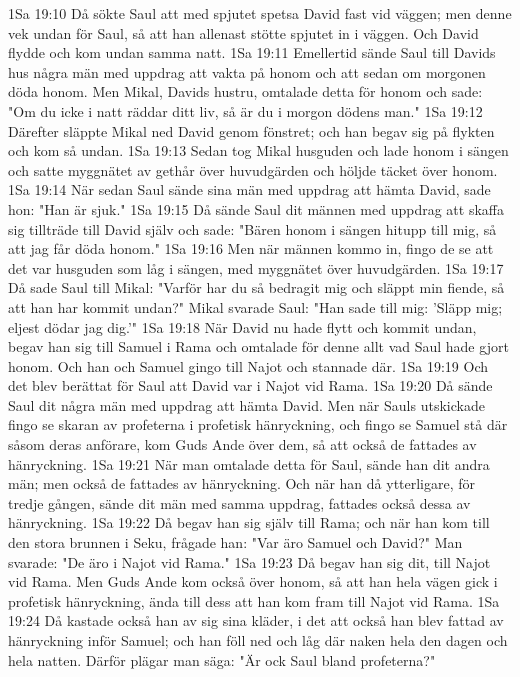 1Sa 19:10  Då sökte Saul att med spjutet spetsa David fast vid väggen; men denne vek undan för Saul, så att han allenast stötte spjutet in i väggen. Och David flydde och kom undan samma natt.
1Sa 19:11  Emellertid sände Saul till Davids hus några män med uppdrag att vakta på honom och att sedan om morgonen döda honom. Men Mikal, Davids hustru, omtalade detta för honom och sade: "Om du icke i natt räddar ditt liv, så är du i morgon dödens man."
1Sa 19:12  Därefter släppte Mikal ned David genom fönstret; och han begav sig på flykten och kom så undan.
1Sa 19:13  Sedan tog Mikal husguden och lade honom i sängen och satte myggnätet av gethår över huvudgärden och höljde täcket över honom.
1Sa 19:14  När sedan Saul sände sina män med uppdrag att hämta David, sade hon: "Han är sjuk."
1Sa 19:15  Då sände Saul dit männen med uppdrag att skaffa sig tillträde till David själv och sade: "Bären honom i sängen hitupp till mig, så att jag får döda honom."
1Sa 19:16  Men när männen kommo in, fingo de se att det var husguden som låg i sängen, med myggnätet över huvudgärden.
1Sa 19:17  Då sade Saul till Mikal: "Varför har du så bedragit mig och släppt min fiende, så att han har kommit undan?" Mikal svarade Saul: "Han sade till mig: 'Släpp mig; eljest dödar jag dig.'"
1Sa 19:18  När David nu hade flytt och kommit undan, begav han sig till Samuel i Rama och omtalade för denne allt vad Saul hade gjort honom. Och han och Samuel gingo till Najot och stannade där.
1Sa 19:19  Och det blev berättat för Saul att David var i Najot vid Rama.
1Sa 19:20  Då sände Saul dit några män med uppdrag att hämta David. Men när Sauls utskickade fingo se skaran av profeterna i profetisk hänryckning, och fingo se Samuel stå där såsom deras anförare, kom Guds Ande över dem, så att också de fattades av hänryckning.
1Sa 19:21  När man omtalade detta för Saul, sände han dit andra män; men också de fattades av hänryckning. Och när han då ytterligare, för tredje gången, sände dit män med samma uppdrag, fattades också dessa av hänryckning.
1Sa 19:22  Då begav han sig själv till Rama; och när han kom till den stora brunnen i Seku, frågade han: "Var äro Samuel och David?" Man svarade: "De äro i Najot vid Rama."
1Sa 19:23  Då begav han sig dit, till Najot vid Rama. Men Guds Ande kom också över honom, så att han hela vägen gick i profetisk hänryckning, ända till dess att han kom fram till Najot vid Rama.
1Sa 19:24  Då kastade också han av sig sina kläder, i det att också han blev fattad av hänryckning inför Samuel; och han föll ned och låg där naken hela den dagen och hela natten. Därför plägar man säga: "Är ock Saul bland profeterna?"
